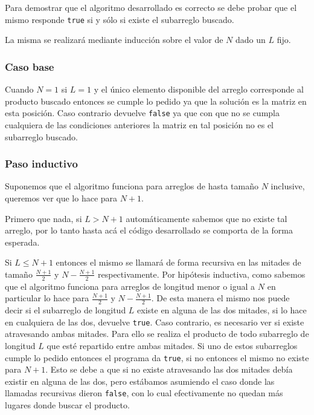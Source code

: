 Para demostrar que el algoritmo desarrollado es correcto se debe probar que el
mismo responde \texttt{true} si y sólo si existe el subarreglo buscado.

La misma se realizará mediante inducción sobre el valor de $N$ dado un $L$ fijo.

\subsubsection*{Caso base}

Cuando $N = 1$ si $L = 1$ y el único elemento disponible del arreglo corresponde
al producto buscado entonces se cumple lo pedido ya que la solución es la matriz
en esta posición. Caso contrario devuelve \texttt{false} ya que con que no se
cumpla cualquiera de las condiciones anteriores la matriz en tal posición no es
el subarreglo buscado.

\subsubsection*{Paso inductivo}

Suponemos que el algoritmo funciona para arreglos de hasta tamaño $N$ inclusive,
queremos ver que lo hace para $N + 1$.

Primero que nada, si $L > N + 1$ automáticamente sabemos que no existe tal
arreglo, por lo tanto hasta acá el código desarrollado se comporta de la forma
esperada.

Si $L \leq N + 1$ entonces el mismo se llamará de forma recursiva en las mitades
de tamaño $\frac{N + 1}{2}$ y $N - \frac{N + 1}{2}$ respectivamente. Por
hipótesis inductiva, como sabemos que el algoritmo funciona para arreglos de
longitud menor o igual a $N$ en particular lo hace para $\frac{N + 1}{2}$ y $N -
\frac{N + 1}{2}$. De esta manera el mismo nos puede decir si el subarreglo de
longitud $L$ existe en alguna de las dos mitades, si lo hace en cualquiera de
las dos, devuelve \texttt{true}. Caso contrario, es necesario ver si existe
atravesando ambas mitades. Para ello se realiza el producto de todo subarreglo
de longitud $L$ que esté repartido entre ambas mitades. Si uno de estos
subarreglos cumple lo pedido entonces el programa da \texttt{true}, si no
entonces el mismo no existe para $N + 1$. Esto se debe a que si no existe
atravesando las dos mitades debía existir en alguna de las dos, pero estábamos
asumiendo el caso donde las llamadas recursivas dieron \texttt{false}, con lo
cual efectivamente no quedan más lugares donde buscar el producto.

